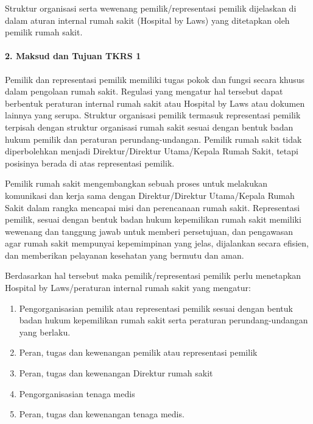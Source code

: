 \documentclass[
]{book}
\providecommand{\tightlist}{%
  \setlength{\itemsep}{0pt}\setlength{\parskip}{0pt}}
\begin{document}
Struktur organisasi serta wewenang pemilik/representasi pemilik dijelaskan di dalam aturan internal rumah sakit (Hospital by Laws) yang ditetapkan oleh pemilik rumah sakit.

\hypertarget{maksud-dan-tujuan-tkrs-1}{%
\paragraph*{2. Maksud dan Tujuan TKRS 1}\label{maksud-dan-tujuan-tkrs-1}}

Pemilik dan representasi pemilik memiliki tugas pokok dan fungsi secara khusus dalam pengolaan rumah sakit. Regulasi yang mengatur hal tersebut dapat berbentuk peraturan internal rumah sakit atau Hospital by Laws atau dokumen lainnya yang serupa. Struktur organisasi pemilik termasuk representasi pemilik terpisah dengan struktur organisasi rumah sakit sesuai dengan bentuk badan hukum pemilik dan peraturan perundang-undangan. Pemilik rumah sakit tidak diperbolehkan menjadi Direktur/Direktur Utama/Kepala Rumah Sakit, tetapi posisinya berada di atas representasi pemilik.

Pemilik rumah sakit mengembangkan sebuah proses untuk melakukan komunikasi dan kerja sama dengan Direktur/Direktur Utama/Kepala Rumah Sakit dalam rangka mencapai misi dan perencanaan rumah sakit. Representasi pemilik, sesuai dengan bentuk badan hukum kepemilikan rumah sakit memiliki wewenang dan tanggung jawab untuk memberi persetujuan, dan pengawasan agar rumah sakit mempunyai kepemimpinan yang jelas, dijalankan secara efisien, dan memberikan pelayanan kesehatan yang bermutu dan aman.

Berdasarkan hal tersebut maka pemilik/representasi pemilik perlu menetapkan Hospital by Laws/peraturan internal rumah sakit yang mengatur:

\begin{enumerate}
\def\labelenumi{\alph{enumi}.}
\tightlist
\item
  Pengorganisasian pemilik atau representasi pemilik sesuai dengan bentuk badan hukum kepemilikan rumah sakit serta peraturan perundang-undangan yang berlaku.
\item
  Peran, tugas dan kewenangan pemilik atau representasi pemilik
\item
  Peran, tugas dan kewenangan Direktur rumah sakit
\item
  Pengorganisasian tenaga medis
\item
  Peran, tugas dan kewenangan tenaga medis.
\end{enumerate}
\end{document}
